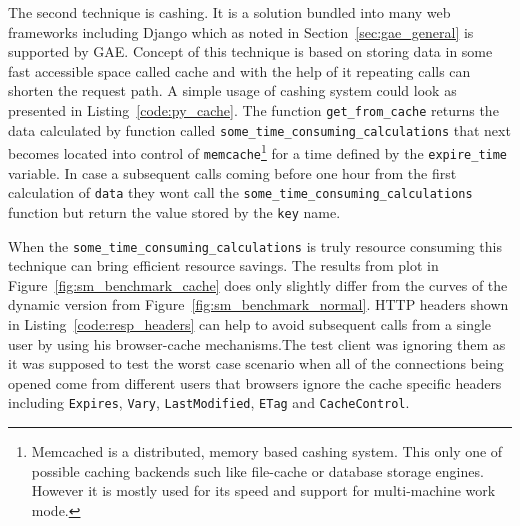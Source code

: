 The second technique is cashing. It is a solution bundled into many web frameworks including Django which as noted  in Section~\ref{sec:gae_general} is supported by GAE. Concept of this technique is based on storing data in some fast accessible space called cache and with the help of it repeating calls can shorten the request path. A simple usage of cashing system could look as presented in Listing~\ref{code:py_cache}. The function \texttt{get\_from\_cache} returns the data calculated by function called \texttt{some\_time\_consuming\_calculations} that next becomes located into control of \texttt{memcache}\footnote{Memcached is a distributed, memory based cashing system. This only one of possible caching backends such like file-cache or database storage engines. However it is mostly used for its speed and support for multi-machine work mode.} for a time defined by the \texttt{expire\_time} variable. In case a subsequent calls coming before one hour from the first calculation of \texttt{data} they wont call the \texttt{some\_time\_consuming\_calculations} function but return the value stored by the \texttt{key} name.        

When the \texttt{some\_time\_consuming\_calculations} is truly resource consuming this technique can bring efficient resource savings. The results from  plot in Figure~\ref{fig:sm_benchmark_cache} does only slightly differ from the curves of the dynamic version from Figure~\ref{fig:sm_benchmark_normal}. HTTP headers shown in Listing~\ref{code:resp_headers} can help to avoid subsequent calls from a single user by using his browser-cache mechanisms.The test client was ignoring them as it was supposed to test the worst case scenario when all of the connections being opened come from different users that browsers ignore the cache specific headers including \texttt{Expires}, \texttt{Vary}, \texttt{Last\-Modified}, \texttt{ETag} and \texttt{Cache\-Control}. 
